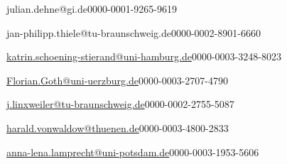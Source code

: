 


\author[1]{Julian Dehne}{julian.dehne@gi.de}{0000-0001-9265-9619}
\author[2]{Jan Philipp Thiele}{jan-philipp.thiele@tu-braunschweig.de}{0000-0002-8901-6660}
\author[3]{Katrin Schöning-Stierand}{\href{mailto:katrin.schoening-stierand@uni-hamburg.de}{katrin.schoening-stierand@uni-hamburg.de}}{0000-0003-3248-8023}
\author[4]{Florian Goth}{\href{mailto:Florian.Goth@uni-wuerzburg.de}{Florian.Goth@uni-uerzburg.de}}{0000-0003-2707-4790}
\author[5]{Jan Linxweiler}{\href{mailto:j.linxweiler@tu-braunschweig.de}{j.linxweiler@tu-braunschweig.de}}{0000-0002-2755-5087}
\author[6]{Harald von Waldow}{\href{mailto:harald.vonwaldow@thuenen.de}{harald.vonwaldow@thuenen.de}}{0000-0003-4800-2833}
\author[7]{Anna-Lena Lamprecht}{\href{mailto:anna-lena.lamprecht@uni-potsdam.de}{anna-lena.lamprecht@uni-potsdam.de}}{0000-0003-1953-5606}

